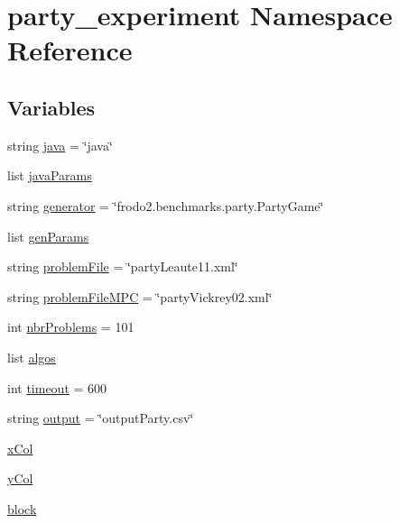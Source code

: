 \hypertarget{namespaceparty__experiment}{}\section{party\+\_\+experiment Namespace Reference}
\label{namespaceparty__experiment}
\subsection*{Variables}
\begin{DoxyCompactItemize}
\item 
string \hyperlink{namespaceparty__experiment_ab94a6102a8d9a5ba4fd35b155a06b727}{java} = \char`\"{}java\char`\"{}
\item 
list \hyperlink{namespaceparty__experiment_a7f69216068bfee498c28ca4be6fda301}{java\+Params}
\item 
string \hyperlink{namespaceparty__experiment_a6867f51172751a35b28e2ff4dff9d1f5}{generator} = \char`\"{}frodo2.\+benchmarks.\+party.\+Party\+Game\char`\"{}
\item 
list \hyperlink{namespaceparty__experiment_a7b133c29cf6a6f324b2f41853c9bf62d}{gen\+Params}
\item 
string \hyperlink{namespaceparty__experiment_a213572fa0b4c4d2f05d22f438e19ee64}{problem\+File} = \char`\"{}party\+Leaute11.\+xml\char`\"{}
\item 
string \hyperlink{namespaceparty__experiment_a5f3bf37977f10a87d5e6d99d319490b8}{problem\+File\+M\+PC} = \char`\"{}party\+Vickrey02.\+xml\char`\"{}
\item 
int \hyperlink{namespaceparty__experiment_a489d5eedda75d9430bb1a5667b86c89f}{nbr\+Problems} = 101
\item 
list \hyperlink{namespaceparty__experiment_abce4cc8c36f7a780c5e01d91fe9f79a8}{algos}
\item 
int \hyperlink{namespaceparty__experiment_a0042bfc2443d967b3e0a70184688f8e7}{timeout} = 600
\item 
string \hyperlink{namespaceparty__experiment_ad72182b83d7e7b5dd7b567bce35bca26}{output} = \char`\"{}output\+Party.\+csv\char`\"{}
\item 
\hyperlink{namespaceparty__experiment_af23775e5ef50f9e8f66252122d3904ce}{x\+Col}
\item 
\hyperlink{namespaceparty__experiment_a8ed57d237b1836cae0e2ee9aa2ffceae}{y\+Col}
\item 
\hyperlink{namespaceparty__experiment_a2de34e8bcf1c61d5963bc1677058931e}{block}
\end{DoxyCompactItemize}


